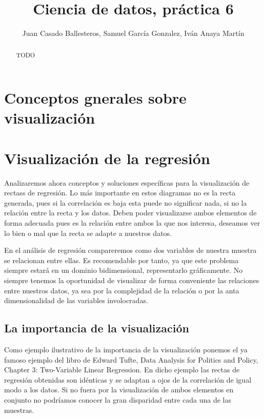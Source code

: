 \documentclass [a4paper] {article}
\title{Ciencia de datos, práctica 6}
\author{Juan Casado Ballesteros, Samuel García Gonzalez, Iván Anaya Martín}
\begin{document}
\maketitle

\begin{abstract}
TODO
\end{abstract}

\newpage
\tableofcontents


\newpage
\section{Conceptos gnerales sobre visualización}

\section{Visualización de la regresión}
Analizaremos ahora conceptos y soluciones específicas para la visualización de rectass de regresión.
Lo más importante en estos diagramas no es la recta generada, pues si la correlación es baja esta puede no significar nada, si no la relación entre la recta y los datos.
Deben poder visualizarse ambos elementos de forma adecuada pues es la relación entre ambos la que nos interesa, deseamos ver lo bien o mal que la recta se adapte a nuestros datos.

En el análisis de regresión compareremos como dos variables de nuestra muestra se relacionan entre ellas.
Es recomendable por tanto, ya que este problema siempre estará en un dominio bidimensional, representarlo gráficamente.
No siempre tenemos la oportunidad de visualizar de forma conveniente las relaciones entre nuestros datos, ya sea por la complejidad de la relación o por la anta dimensionalidad de las variables involocradas.

\subsection{La importancia de la visualización}
Como ejemplo ilustrativo de la importancia de la visualización ponemos el ya famoso ejemplo del libro de Edward Tufte, Data Analysis for Politics and Policy, Chapter 3: Two-Variable Linear Regression.
En dicho ejemplo las rectas de regresión obtenidas son idénticas y se adaptan a ojos de la correlación de igual modo a los datos.
Si no fuera por la visualización de ambos elementos en conjunto no podríamos conocer la gran disparidad entre cada una de las muestras.
\end{document}
